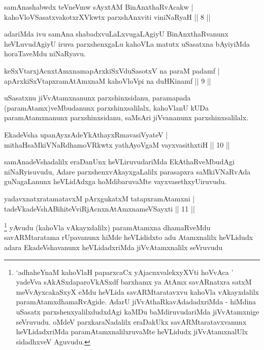
\begin{shl}
samAnashabwdx teVneVmw sAyxtAM BinAnxthaRvAcakw |\\
kahoVloVSasatxvakotxrXVkwtx parxshAnxviti viniNaRyaH \hfill || 8 ||
\end{shl}

\begin{artha}
adariMda ivu samAna shabadxvuLaLxvugaLAgiyU BinAnxthaRvanunx heVLuvudAgiyU iruva parxshenxgaLu kahoVLa matutx uSasatxna bAyiyiMda horaTaveMdu niNaRyavu.
\end{artha}%


\begin{shl}
keSxVtarxjAcnxtAmxnamapArxkiSxVduSasotxV na paraM padamf |\\
apArxkiSxVtapxramAtAmxnaM kahoVloV\s pi na duHKinamf \hfill || 9 ||
\end{shl}

\begin{artha}
uSasatxnu jiVvAtamxnanunx parxshinxsidanu, paramapada (paramAtamx)\break veMbudanunx parxshinxsalilalx, kahoVlanU kUDa paramAtamxnanunx parxshinxsidanu, saMsAri jiVvananunx parxshinxsalilalx.
\end{artha}


\begin{shl}
EkadeVsha upanAyxsAdeYkAthayxRmavasiVyateV |\\
mithaHsaMkiVNaRdhamoVRkwtx yathAyoVgaM vayxvasithxtiH \hfill || 10 ||
\end{shl}

\begin{artha}
samAnadeVshadalilx eraDanUnx heVLiruvudariMda EkAthaRveMbudAgi niNaRyisuvudu, Adare parxshenxvAkayxgaLalilx parasapxra saMkiVNaRvAda guNagaLanunx heVLidAdxga hoMdibaruvaMte vayxvasethxyU\break iruvudu.
\end{artha}

\begin{shl}
yadavxnatxratamatavxM pArxgukatxM tatapxramAtamxni |\\
tadeVkadeVshABihiteVviRjAcnxnAtAmxnameVSayxti \hfill || 11 ||
\end{shl}

\begin{artha}%
\footnote{`adhaheYnaM kahoVlaH paparxcaCx yAjacnxvalekxyXVti hoVvAca  ' yadeVva sAkASxdaparoVkASxdf barxhamx ya AtAmx savARnatxra satxM meVvAyxcakaSxyX eMdu heVLida savARMtaratavxvu kahoVla vAkayxdalilx paramAtamxdhamaRvAgide. AdarU jiVvAthaRkavAdadadxriMda - hiMdina uSasatx parxshenxyalilxdudxdAgi kaMDu baMdiruvudariMda jiVvAtamxnige seVruvudu. oMdeV parxkaraNadalilx eraDakUkx savARMtaratavxvanunx heVLidadxriMda paramAtamxnalilxruvaMte heVLidudx jiVvAtamxnalUlx sidadhxveV Aguvudu.} yAvudu (kahoVla vAkayxdalilx) paramAtamxna dhamaRveMdu savARMtaratama rUpavanunx hiMde heVLididxto adu Atamxnalilx heVLidudx adara EkadeVshavanunx heVLidadxriMda jiVvAtamxnalilx seVruvudu
\end{artha}

